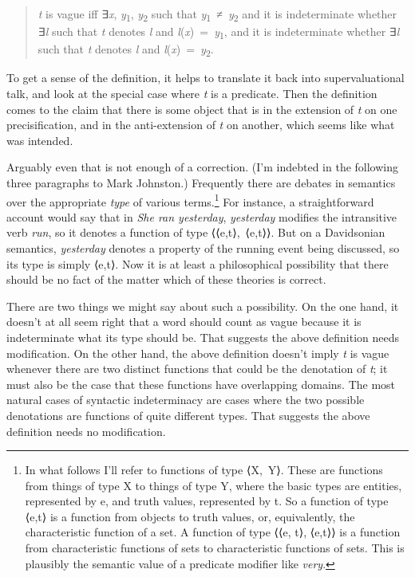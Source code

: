 \documentclass[
  10pt,
  letterpaper,
  DIV=11,
  numbers=noendperiod,
  twoside]{scrartcl}
\begin{document}
\begin{quote}
\emph{t} is vague iff ∃\emph{x}, \emph{y}\textsubscript{1},
\emph{y}\textsubscript{2} such that
\emph{y}\textsubscript{1}~≠~\emph{y}\textsubscript{2} and it is
indeterminate whether ∃\emph{l} such that \emph{t} denotes \emph{l} and
\emph{l}(\emph{x})~=~\emph{y}\textsubscript{1}, and it is indeterminate
whether ∃\emph{l} such that \emph{t} denotes \emph{l} and
\emph{l}(\emph{x})~=~\emph{y}\textsubscript{2}.
\end{quote}

To get a sense of the definition, it helps to translate it back into
supervaluational talk, and look at the special case where \emph{t} is a
predicate. Then the definition comes to the claim that there is some
object that is in the extension of \emph{t} on one precisification, and
in the anti-extension of \emph{t} on another, which seems like what was
intended.

Arguably even that is not enough of a correction. (I'm indebted in the
following three paragraphs to Mark Johnston.) Frequently there are
debates in semantics over the appropriate \emph{type} of various
terms.\footnote{In what follows I'll refer to functions of type ⟨X,~Y⟩.
  These are functions from things of type X to things of type Y, where
  the basic types are entities, represented by e, and truth values,
  represented by t. So a function of type ⟨e,t⟩ is a function from
  objects to truth values, or, equivalently, the characteristic function
  of a set. A function of type ⟨⟨e, t⟩, ⟨e,t⟩⟩ is a function from
  characteristic functions of sets to characteristic functions of sets.
  This is plausibly the semantic value of a predicate modifier like
  \emph{very}.} For instance, a straightforward account would say that
in \emph{She ran yesterday}, \emph{yesterday} modifies the intransitive
verb \emph{run}, so it denotes a function of type ⟨⟨e,t⟩,~⟨e,t⟩⟩. But on
a Davidsonian semantics, \emph{yesterday} denotes a property of the
running event being discussed, so its type is simply ⟨e,t⟩. Now it is at
least a philosophical possibility that there should be no fact of the
matter which of these theories is correct.

There are two things we might say about such a possibility. On the one
hand, it doesn't at all seem right that a word should count as vague
because it is indeterminate what its type should be. That suggests the
above definition needs modification. On the other hand, the above
definition doesn't imply \emph{t} is vague whenever there are two
distinct functions that could be the denotation of \emph{t}; it must
also be the case that these functions have overlapping domains. The most
natural cases of syntactic indeterminacy are cases where the two
possible denotations are functions of quite different types. That
suggests the above definition needs no modification.
\end{document}
